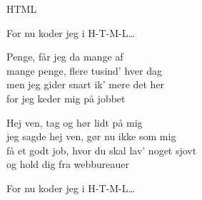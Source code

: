\begin{song}{HTML}
  \begin{SBChorus}
    For nu koder jeg i H-T-M-L\ldots
  \end{SBChorus}

  \begin{SBVerse}
    Penge, får jeg da mange af\\
    mange penge, flere tusind' hver dag\\
    men jeg gider snart ik' mere det her\\
    for jeg keder mig på jobbet
  \end{SBVerse}

  \begin{SBVerse}
    Hej ven, tag og hør lidt på mig\\
    jeg sagde hej ven, gør nu ikke som mig\\
    få et godt job, hvor du skal lav' noget sjovt\\
    og hold dig fra webbureauer
  \end{SBVerse}

  \begin{SBChorus}
    For nu koder jeg i H-T-M-L\ldots
  \end{SBChorus}
\end{song}